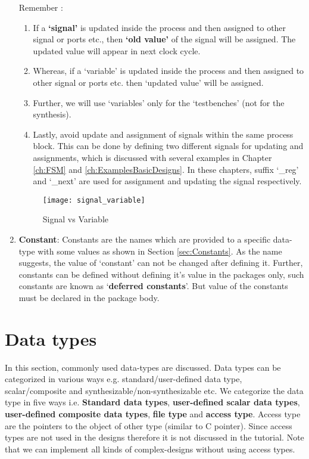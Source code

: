 \begin{enumerate}
	\begin{noNumBox}
		Remember : 	
		\begin{enumerate}
			\item  If a \textbf{`signal'} is updated inside the process and then assigned to other signal or ports etc., then \textbf{`old value'} of the signal will be assigned. The updated value will appear in next clock cycle. 
			\item Whereas, if a `variable' is updated inside the process and then assigned to other signal or ports etc. then `updated value' will be assigned. 
			\item Further, we will use `variables' only for the `testbenches' (not for the synthesis). 
			\item Lastly, avoid update and assignment of signals within the same process block. This can be done by defining two different signals for updating and assignments, which is discussed with several examples in Chapter \ref{ch:FSM} and \ref{ch:ExamplesBasicDesigns}. In these chapters, suffix `\_reg' and `\_next' are used for assignment and updating the signal respectively. 
		\end{enumerate}
	\end{noNumBox}
	
	\begin{figure}[!h]
		\centering
		\texttt{[image: signal\_variable]}
		\caption{Signal vs Variable}
		\label{fig:signal_variable}
	\end{figure}
	
	
	\item \textbf{Constant}: Constants are the names which are provided to a specific data-type with some values as shown in Section \ref{sec:Constants}. As the name suggests, the value of `constant' can not be changed after defining it. Further, constants can be defined without defining it's value in the packages only, such constants are known as `\textbf{deferred constants}'. But value of the constants must be declared in the package body.  
	 
\end{enumerate}

\section{Data types}
In this section, commonly used data-types are discussed. Data types can be categorized in various ways e.g. standard/user-defined data type, scalar/composite and synthesizable/non-synthesizable etc. We categorize the data type in five ways i.e. \textbf{Standard data types}, \textbf{user-defined scalar data types}, \textbf{user-defined composite data types}, \textbf{file type} and \textbf{access type}. Access type are the pointers to the object of other type (similar to C pointer). Since access types are not used in the designs therefore it is not discussed in the tutorial. Note that we can implement all kinds of complex-designs without using access types. 

